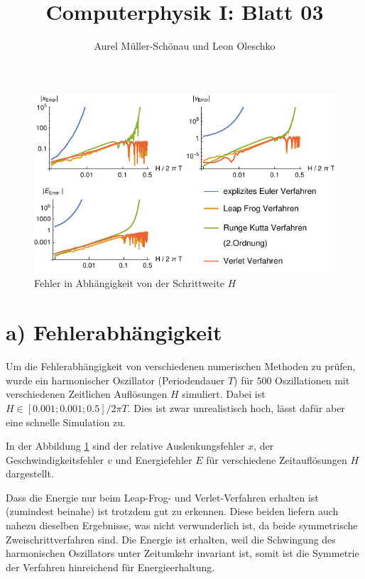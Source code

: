 




\title{Computerphysik I: Blatt 03}
\author{Aurel Müller-Schönau und Leon Oleschko}
\maketitle

\begin{figure}[h!]
	\centering
	\includegraphics[width=\linewidth]{A_plot.pdf}
	\caption{Fehler in Abhängigkeit von der Schrittweite $H$}
	\label{fig:fehler}
\end{figure}


\section*{a) Fehlerabhängigkeit}
Um die Fehlerabhängigkeit von verschiedenen numerischen Methoden zu prüfen, wurde ein harmonischer Oszillator (Periodendauer $T$) für $500$ Oszillationen mit verschiedenen Zeitlichen Auflösungen $H$ simuliert. Dabei ist $H\in[0.001;0.001;0.5]/2\pi T$. 
Dies ist zwar unrealistisch hoch, lässt dafür aber eine schnelle Simulation zu.

In der Abbildung \ref{fig:fehler} sind der relative Auslenkungsfehler $x$, der Geschwindigkeitsfehler $v$ und Energiefehler $E$ für verschiedene Zeitauflösungen $H$ dargestellt.

Dass die Energie nur beim Leap-Frog- und Verlet-Verfahren erhalten ist (zumindest beinahe) ist trotzdem gut zu erkennen.
Diese beiden liefern auch nahezu dieselben Ergebnisse, was nicht verwunderlich ist, da beide symmetrische Zweischrittverfahren sind. Die Energie ist erhalten, weil die Schwingung des harmonischen Oszillators unter Zeitumkehr invariant ist, somit ist die Symmetrie der Verfahren hinreichend für Energieerhaltung.

